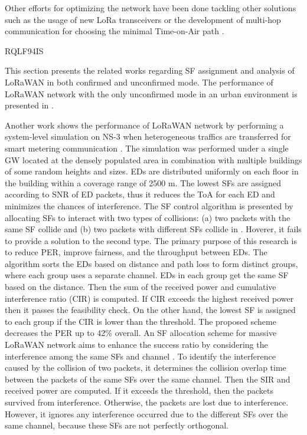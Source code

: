 Other efforts for optimizing the network have been done tackling other solutions such as the usage of new LoRa transceivers \cite{bor_lora_nodate} or the development of multi-hop communication for choosing the minimal Time-on-Air path \cite{sartori_enabling_2017}.

\cite{farhad_scalability_2019} RQLF94IS

This section presents the related works regarding SF assignment and analysis of LoRaWAN in both confirmed and unconfirmed mode.
The performance of LoRaWAN network with the only unconfirmed mode in an urban environment is presented in \cite{magrin_performance_2017}.



Another work shows the performance of LoRaWAN network by performing a system-level simulation on NS-3 when heterogeneous traffics are transferred for smart metering communication \cite{gupta_modelling_2017}.
The simulation was performed under a single GW located at the densely populated area in combination with multiple buildings of some random heights and sizes.
EDs are distributed uniformly on each floor in the building within a coverage range of 2500 m.
The lowest SFs are assigned according to SNR of ED packets,
	thus it reduces the ToA for each ED and minimizes the chances of interference.
The SF control algorithm is presented by allocating SFs to interact with two types of collisions:
	(a) two packets with the same SF collide and (b) two packets with different SFs collide in \cite{reynders_power_2017}.
Hoverer,
	it fails to provide a solution to the second type.
The primary purpose of this research is to reduce PER,
	improve fairness,
	and the throughput between EDs.
The algorithm sorts the EDs based on distance and path loss to form distinct groups,
	where each group uses a separate channel.
EDs in each group get the same SF based on the distance.
Then the sum of the received power and cumulative interference ratio (CIR) is computed.
If CIR exceeds the highest received power then it passes the feasibility check.
On the other hand,
	the lowest SF is assigned to each group if the CIR is lower than the threshold.
The proposed scheme decreases the PER up to 42\% overall.
An SF allocation scheme for massive LoRaWAN network aims to enhance the success ratio by considering the interference among the same SFs and channel \cite{lim_spreading_2018}.
To identify the interference caused by the collision of two packets,
	it determines the collision overlap time between the packets of the same SFs over the same channel.
Then the SIR and received power are computed.
If it exceeds the threshold,
	then the packets survived from interference.
Otherwise,
	the packets are lost due to interference.
However,
	it ignores any interference occurred due to the different SFs over the same channel,
	because these SFs are not perfectly orthogonal.



